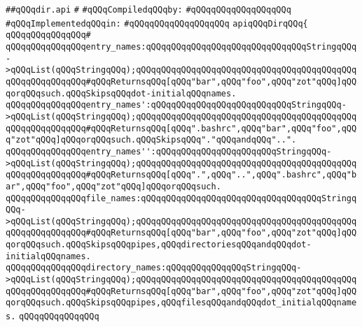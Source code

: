 \label{src/lib/src/dir.api}
\verb|##qQQqdir.api|\newline
\verb|#|\newline
\newline
\verb|#qQQqCompiledqQQqby:|\newline
\verb|#qQQqqQQqqQQqqQQqqQQq|\newline
\newline
\verb|#qQQqImplementedqQQqin:|\newline
\verb|#qQQqqQQqqQQqqQQqqQQq|\newline
\newline
\verb|apiqQQqDirqQQq{|\newline
\verb|qQQqqQQqqQQqqQQq#|\newline
\verb|qQQqqQQqqQQqqQQqentry_names:qQQqqQQqqQQqqQQqqQQqqQQqqQQqqQQqStringqQQq->qQQqList(qQQqStringqQQq);qQQqqQQqqQQqqQQqqQQqqQQqqQQqqQQqqQQqqQQqqQQqqQQqqQQqqQQqqQQq#qQQqReturnsqQQq[qQQq"bar",qQQq"foo",qQQq"zot"qQQq]qQQqorqQQqsuch.qQQqSkipsqQQqdot-initialqQQqnames.|\newline
\verb|qQQqqQQqqQQqqQQqentry_names':qQQqqQQqqQQqqQQqqQQqqQQqqQQqStringqQQq->qQQqList(qQQqStringqQQq);qQQqqQQqqQQqqQQqqQQqqQQqqQQqqQQqqQQqqQQqqQQqqQQqqQQqqQQqqQQq#qQQqReturnsqQQq[qQQq".bashrc",qQQq"bar",qQQq"foo",qQQq"zot"qQQq]qQQqorqQQqsuch.qQQqSkipsqQQq"."qQQqandqQQq"..".|\newline
\verb|qQQqqQQqqQQqqQQqentry_names'':qQQqqQQqqQQqqQQqqQQqqQQqStringqQQq->qQQqList(qQQqStringqQQq);qQQqqQQqqQQqqQQqqQQqqQQqqQQqqQQqqQQqqQQqqQQqqQQqqQQqqQQqqQQq#qQQqReturnsqQQq[qQQq".",qQQq"..",qQQq".bashrc",qQQq"bar",qQQq"foo",qQQq"zot"qQQq]qQQqorqQQqsuch.|\newline
\newline
\verb|qQQqqQQqqQQqqQQqfile_names:qQQqqQQqqQQqqQQqqQQqqQQqqQQqqQQqqQQqStringqQQq->qQQqList(qQQqStringqQQq);qQQqqQQqqQQqqQQqqQQqqQQqqQQqqQQqqQQqqQQqqQQqqQQqqQQqqQQqqQQq#qQQqReturnsqQQq[qQQq"bar",qQQq"foo",qQQq"zot"qQQq]qQQqorqQQqsuch.qQQqSkipsqQQqpipes,qQQqdirectoriesqQQqandqQQqdot-initialqQQqnames.|\newline
\verb|qQQqqQQqqQQqqQQqdirectory_names:qQQqqQQqqQQqqQQqStringqQQq->qQQqList(qQQqStringqQQq);qQQqqQQqqQQqqQQqqQQqqQQqqQQqqQQqqQQqqQQqqQQqqQQqqQQqqQQqqQQq#qQQqReturnsqQQq[qQQq"bar",qQQq"foo",qQQq"zot"qQQq]qQQqorqQQqsuch.qQQqSkipsqQQqpipes,qQQqfilesqQQqandqQQqdot_initialqQQqnames.|\newline
\verb|qQQqqQQqqQQqqQQq|\newline
